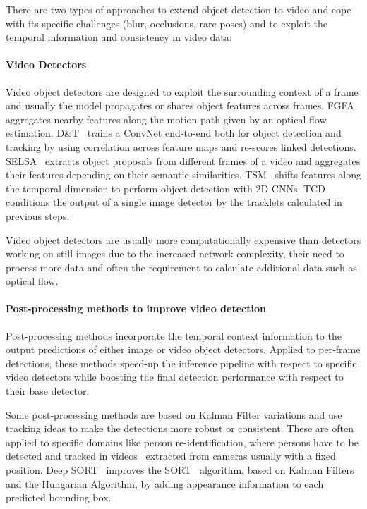 \documentclass[letterpaper, 10 pt, conference]{ieeeconf}
\begin{document}
There are two types of approaches to extend object detection to video and cope with its specific challenges  (blur, occlusions, rare poses) and to exploit the temporal information and consistency in video data:

\paragraph{Video Detectors}


Video object detectors are designed to exploit the surrounding context of a frame and usually the model propagates or shares object features across frames. 
FGFA~\cite{Zhu_2017_ICCV} aggregates nearby features along the motion path given by an optical flow estimation. D\&T~\cite{Feichtenhofer17DetectTrack} trains a ConvNet end-to-end both for object detection and tracking by using correlation across feature maps and re-scores linked detections. SELSA~\cite{wu2019selsa} extracts object proposals from different frames of a video and aggregates their features depending on their semantic similarities. TSM~\cite{Lin_2019_ICCV} shifts features along the temporal dimension to perform object detection with 2D CNNs. TCD~\cite{DBLP:journals/corr/abs-1811-11167} conditions the output of a single image detector by the tracklets calculated in previous steps.



Video object detectors are usually more computationally expensive than detectors working on still images due to the increased network complexity, their need to process more data and often the requirement to calculate additional data such as optical flow. 

\paragraph{Post-processing methods to improve video detection}
Post-processing methods incorporate the temporal context information to the output predictions of either image or video object detectors. 
Applied to per-frame detections, these methods speed-up the inference pipeline with respect to specific video detectors while boosting the final detection performance with respect to their base detector.

Some post-processing methods are based on Kalman Filter variations and use tracking ideas to make the detections more robust or consistent. These are often applied to specific domains like person re-identification, where persons have to be detected and tracked in videos~\cite{DBLP:journals/corr/MilanL0RS16, Chavdarova_2018_CVPR} extracted from cameras usually with a fixed position. Deep SORT~\cite{Wojke2017simple} improves the SORT~\cite{Bewley2016_sort} algorithm, based on Kalman Filters and the Hungarian Algorithm, by adding appearance information to each predicted bounding box.
\end{document}
